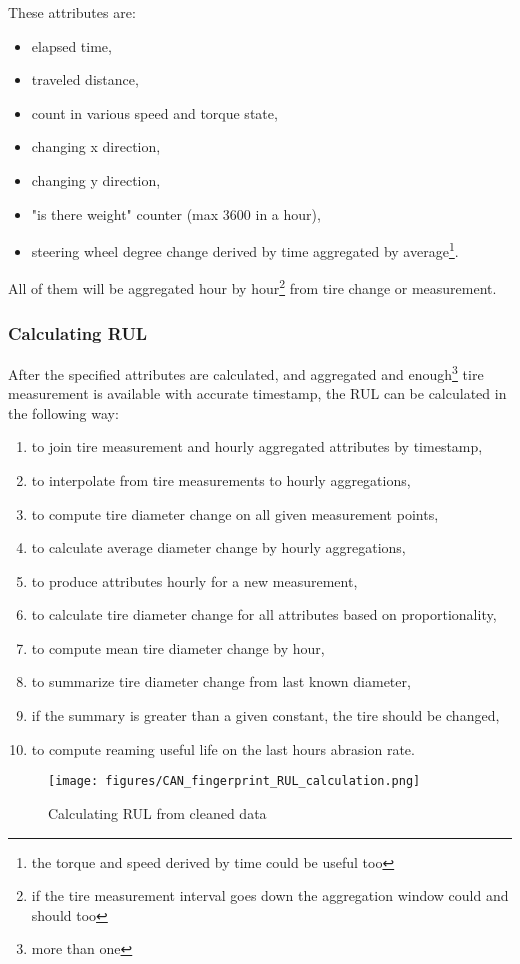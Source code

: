	These attributes are:
	\begin{itemize}
		\item{elapsed time,} 
		\item{traveled distance,} 
		\item{count in various speed and torque state,}
		\item{changing x direction,}
		\item{changing y direction,}
		\item{"is there weight" counter (max 3600 in a hour),}
		\item{steering wheel degree change derived by time aggregated by average\footnote{the torque and speed derived by time could be useful too}.}
	\end{itemize}
	All of them will be aggregated hour by hour\footnote{if the tire measurement interval goes down the aggregation window could and should too} from tire change or measurement.
	\subsubsection{Calculating RUL}
	After the specified attributes are calculated, and aggregated and enough\footnote{more than one} tire measurement is available with accurate timestamp, the RUL can be calculated in the following way:

	\begin{enumerate}
		\item{to join tire measurement and hourly aggregated attributes by timestamp,}
		\item{to interpolate from tire measurements to hourly aggregations,}
		\item{to compute tire diameter change on all given measurement points,}
		\item{to calculate average diameter change by hourly aggregations,} 
		\item{to produce attributes hourly for a new measurement,}
		\item{to calculate tire diameter change for all attributes based on proportionality,}
		\item{to compute mean tire diameter change by hour,}
		\item{to summarize tire diameter change from last known diameter,}
		\item{if the summary is greater than a given constant, the tire should be changed,}
		\item{to compute reaming useful life on the last hours abrasion rate.}
	\end{enumerate}
	\begin{figure}[!ht]
		\centering
		\texttt{[image: figures/CAN\_fingerprint\_RUL\_calculation.png]}
		\caption{Calculating RUL from cleaned data} 
	\end{figure}
